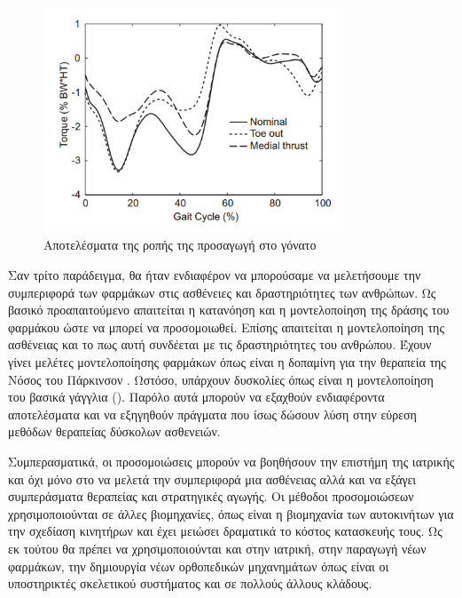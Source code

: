 \begin{figure}[H]
    \centering
    \includegraphics[width=0.8\textwidth]{fig/knee-load.png}
    \caption{Αποτελέσματα της ροπής της προσαγωγή στο γόνατο \cite{fregly07}}
    \label{fig:knee-load}
\end{figure}

Σαν τρίτο παράδειγμα, θα ήταν ενδιαφέρον να μπορούσαμε να μελετήσουμε την συμπεριφορά των φαρμάκων στις ασθένειες και δραστηριότητες των ανθρώπων. Ως βασικό προαπαιτούμενο απαιτείται η κατανόηση και η μοντελοποίηση της δράσης του φαρμάκου ώστε να μπορεί να προσομοιωθεί. Επίσης απαιτείται η μοντελοποίηση της ασθένειας και το πως αυτή συνδέεται με τις δραστηριότητες του ανθρώπου. Έχουν γίνει μελέτες μοντελοποίησης φαρμάκων όπως είναι η δοπαμίνη για την θεραπεία της Νόσος του Πάρκινσον \cite{haeri05}. Ωστόσο, υπάρχουν δυσκολίες όπως είναι η μοντελοποίηση του βασικά γάγγλια (). Παρόλο αυτά μπορούν να εξαχθούν ενδιαφέροντα αποτελέσματα και να εξηγηθούν πράγματα που ίσως δώσουν λύση στην εύρεση μεθόδων θεραπείας δύσκολων ασθενειών.

Συμπερασματικά, οι προσομοιώσεις μπορούν να βοηθήσουν την επιστήμη της ιατρικής και όχι μόνο στο να μελετά την συμπεριφορά μια ασθένειας αλλά και να εξάγει συμπεράσματα θεραπείας και στρατηγικές αγωγής. Οι μέθοδοι προσομοιώσεων χρησιμοποιούνται σε άλλες βιομηχανίες, όπως είναι η βιομηχανία των αυτοκινήτων για την σχεδίαση κινητήρων και έχει μειώσει δραματικά το κόστος κατασκευής τους. Ως εκ τούτου θα πρέπει να χρησιμοποιούνται και στην ιατρική, στην παραγωγή νέων φαρμάκων, την δημιουργία νέων ορθοπεδικών μηχανημάτων όπως είναι οι υποστηρικτές σκελετικού συστήματος \cite{stopforth12} και σε πολλούς άλλους κλάδους.
